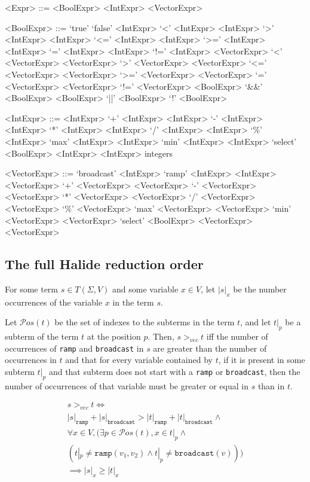 \documentclass[sigplan,10pt,review,anonymous]{acmart}\settopmatter{printfolios=true,printccs=false,printacmref=false}
\begin{document}
\begin{grammar}
<Expr> ::= <BoolExpr> 
\alt <IntExpr> 
\alt <VectorExpr>

<BoolExpr> ::= `true'
\alt `false'
\alt <IntExpr> `<' <IntExpr>
\alt <IntExpr> `>' <IntExpr>
\alt <IntExpr> `<=' <IntExpr>
\alt <IntExpr> `>=' <IntExpr>
\alt <IntExpr> `=' <IntExpr>
\alt <IntExpr> `!=' <IntExpr>
\alt <VectorExpr> `<' <VectorExpr>
\alt <VectorExpr> `>' <VectorExpr>
\alt <VectorExpr> `<=' <VectorExpr>
\alt <VectorExpr> `>=' <VectorExpr>
\alt <VectorExpr> `=' <VectorExpr>
\alt <VectorExpr> `!=' <VectorExpr>
\alt <BoolExpr> `&&' <BoolExpr>
\alt <BoolExpr> `||' <BoolExpr>
\alt `!' <BoolExpr>

<IntExpr> ::= <IntExpr> `+' <IntExpr>
\alt <IntExpr> `-' <IntExpr>
\alt <IntExpr> `*' <IntExpr>
\alt <IntExpr> `/' <IntExpr>
\alt <IntExpr> `\%' <IntExpr>
\alt `max' <IntExpr> <IntExpr>
\alt `min' <IntExpr> <IntExpr>
\alt `select' <BoolExpr> <IntExpr> <IntExpr>
\alt integers

<VectorExpr> ::= `broadcast' <IntExpr>
\alt `ramp' <IntExpr> <IntExpr>
\alt <VectorExpr> `+' <VectorExpr>
\alt <VectorExpr> `-' <VectorExpr>
\alt <VectorExpr> `*' <VectorExpr>
\alt <VectorExpr> `/' <VectorExpr>
\alt <VectorExpr> `\%' <VectorExpr>
\alt `max' <VectorExpr> <VectorExpr>
\alt `min' <VectorExpr> <VectorExpr>
\alt `select' <BoolExpr> <VectorExpr> <VectorExpr>
\end{grammar}

\subsection{The full Halide reduction order}
\label{a:reductionorder}

For some term $s \in T(\Sigma, V)$ and some variable $x \in V$, let $|s|_x$ be the number occurrences of the variable $x$ in the term $s$.

Let $\mathcal{P}os(t)$ be the set of indexes to the subterms in the term $t$, and let $t|_p$ be a subterm of the term $t$ at the position $p$. Then, $s >_{vec} t$ iff the number of occurrences of \texttt{ramp} and \texttt{broadcast} in $s$ are greater than the number of occurrences in $t$ and that for every variable contained by $t$, if it is present in some subterm $t|_p$ and that subterm does not start with a \texttt{ramp} or \texttt{broadcast}, then the number of occurrences of that variable must be greater or equal in $s$ than in $t$.

\begin{gather*}
s >_{vec} t \iff \\
 |s|_{\texttt{ramp}} + |s|_{\texttt{broadcast}} > |t|_{\texttt{ramp}} + |t|_{\texttt{broadcast}} \wedge \\
\forall x \in V, (\exists p \in \mathcal{P}os(t), x \in t|_p \wedge \\
(t|_p \neq \texttt{ramp}(v_1,v_2) \wedge t|_p \neq \texttt{broadcast}(v))) \\
\implies |s|_x \geq |t|_x
\end{gather*}
\end{document}
